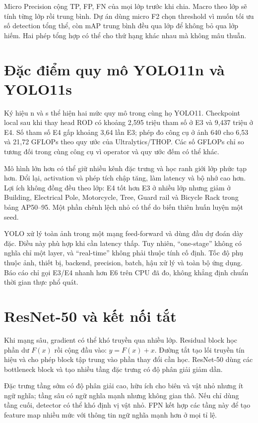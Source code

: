\documentclass[12pt,a4paper,oneside]{report}
\begin{document}
Micro Precision cộng TP, FP, FN của mọi lớp trước khi chia. Macro theo lớp sẽ tính từng lớp rồi trung bình. Dự án dùng micro F2 chọn threshold vì muốn tối ưu số detection tổng thể, còn mAP trung bình đều qua lớp để không bỏ qua lớp hiếm. Hai phép tổng hợp có thể cho thứ hạng khác nhau mà không mâu thuẫn.

\section{Đặc điểm quy mô YOLO11n và YOLO11s}
Ký hiệu n và s thể hiện hai mức quy mô trong cùng họ YOLO11. Checkpoint local sau khi thay head ROD có khoảng 2,595 triệu tham số ở E3 và 9,437 triệu ở E4. Số tham số E4 gấp khoảng 3,64 lần E3; phép đo công cụ ở ảnh 640 cho 6,53 và 21,72 GFLOPs theo quy ước của Ultralytics/THOP. Các số GFLOPs chỉ so tương đối trong cùng công cụ vì operator và quy ước đếm có thể khác.

Mô hình lớn hơn có thể giữ nhiều kênh đặc trưng và học ranh giới lớp phức tạp hơn. Đổi lại, activation và phép tích chập tăng, làm latency và bộ nhớ cao hơn. Lợi ích không đồng đều theo lớp: E4 tốt hơn E3 ở nhiều lớp nhưng giảm ở Building, Electrical Pole, Motorcycle, Tree, Guard rail và Bicycle Rack trong bảng AP50--95. Một phần chênh lệch nhỏ có thể do biến thiên huấn luyện một seed.

YOLO xử lý toàn ảnh trong một mạng feed-forward và dùng đầu dự đoán dày đặc. Điều này phù hợp khi cần latency thấp. Tuy nhiên, “one-stage” không có nghĩa chỉ một layer, và “real-time” không phải thuộc tính cố định. Tốc độ phụ thuộc ảnh, thiết bị, backend, precision, batch, hậu xử lý và toàn bộ ứng dụng. Báo cáo chỉ gọi E3/E4 nhanh hơn E6 trên CPU đã đo, không khẳng định chuẩn thời gian thực phổ quát.

\section{ResNet-50 và kết nối tắt}
Khi mạng sâu, gradient có thể khó truyền qua nhiều lớp. Residual block học phần dư $F(x)$ rồi cộng đầu vào: $y=F(x)+x$. Đường tắt tạo lối truyền tín hiệu và cho phép block tập trung vào phần thay đổi cần học. ResNet-50 dùng các bottleneck block và tạo nhiều tầng đặc trưng có độ phân giải giảm dần.

Đặc trưng tầng sớm có độ phân giải cao, hữu ích cho biên và vật nhỏ nhưng ít ngữ nghĩa; tầng sâu có ngữ nghĩa mạnh nhưng không gian thô. Nếu chỉ dùng tầng cuối, detector có thể khó định vị vật nhỏ. FPN kết hợp các tầng này để tạo feature map nhiều mức với thông tin ngữ nghĩa mạnh hơn ở mọi tỉ lệ.
\end{document}
